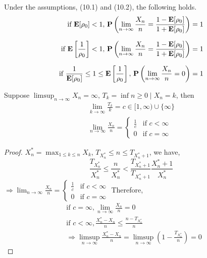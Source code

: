 \documentclass[main]{subfiles}
\begin{document}
\begin{theorem}
	Under the assumptions, (10.1) and (10.2), the following holds.
	\begin{align*}
		\text{if} \,\, \mathbf E[\rho_{0}] <1,\,\mathbf P\left(\lim_{n \to \infty} \frac{X_n}{n} = \frac{1-\mathbf E[\rho_{0}]}{1+\mathbf E[\rho_{0}]}\right) = 1                      \\[0.25cm]
		\text{if} \,\, \mathbf E\left[\frac{1}{\rho_{0}}\right] <1,\,\mathbf P\left(\lim_{n \to \infty} \frac{X_n}{n} = \frac{1-\mathbf E[\rho_{0}]}{1+\mathbf E[\rho_{0}]}\right) = 1 \\[0.25cm]
		\text{if} \,\, \frac{1}{\mathbf E[\rho_{0}]} \leq 1 \leq \mathbf E\left[\frac{1}{\rho_{0}}\right],\,\mathbf P\left(\lim_{n \to \infty} \frac{X_n}{n} = 0\right) = 1
	\end{align*}
\end{theorem}
\begin{lemma}
	Suppose $\limsup_{n \to \infty} X_n = \infty,\, T_{k} = \inf{n \geq 0 \mid X_n = k}$, then
	\begin{align*}
		\lim_{k \to \infty} \frac{T_k}{k} = c \in [1,\infty) \cup \{\infty\} \\[0.25cm]
		\lim_{n \to \infty} \frac{X_n}{n} =
		\begin{cases}
			\frac{1}{c} & \text{if } c < \infty \\
			0           & \text{if } c = \infty
		\end{cases}
	\end{align*}
\end{lemma}
\begin{proof}
	$X_n^{\ast} = \max_{1 \leq k \leq n} X_{k}$, $T_{X_n^{\ast}} \leq n \leq T_{X_n^{\ast}+1}$, we have,
	$$\frac{T_{X_n^{\ast}}}{X_n^{\ast}} \leq \frac{n}{X_n^{\ast}} < \frac{T_{X_n^{\ast}+1}}{T_{X_n^{\ast}+1}}\frac{X_n^{\ast}+1}{X_n^{\ast}}$$
	$\Rightarrow \lim_{n \to \infty} \frac{X_n}{n} =
		\begin{cases}
			\frac{1}{c} & \text{if } c < \infty \\
			0           & \text{if } c = \infty
		\end{cases}$
	Therefore,
	\begin{align*}
		 & \text{if}\,\,c=\infty, \lim_{n \to \infty} \frac{X_n}{n} = 0                                                                       \\[0.25cm]
		 & \text{if}\,\,c < \infty, \frac{X_n^{\ast}-X_n}{n} \leq \frac{n-T_{X_n^{\ast}}}{n}                                                  \\[0.25cm]
		 & \Rightarrow \limsup_{n \to \infty} \frac{X_n^{\ast}- X_n}{n}  = \limsup_{n \to \infty} \left(1- \frac{T_{X_n^{\ast}}}{n}\right) =0
	\end{align*}

\end{proof}
\end{document}
